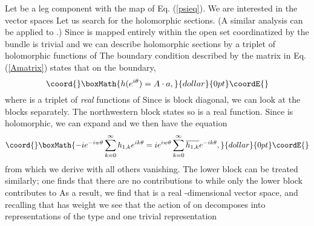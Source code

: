 \documentclass[a4paper,11pt]{article}
\begin{document}
Let \coordHE{} be a leg component with \myHighlight{$\psi$}\coordHE{} the map
of Eq. (\ref{psieq}).  We are interested in the vector
spaces \coordHE{}  \coordHE{}
Let us search for \coordHE{} the holomorphic sections.  (A
similar analysis can be applied to \coordHE{}.)
Since \coordHE{} is mapped entirely
within the open set \coordHE{} coordinatized by
\coordHE{} the bundle \coordHE{} is trivial and we can
describe holomorphic sections by a triplet
\coordHE{} of holomorphic functions of \coordHE{}
The boundary condition described by the 
matrix \coordHE{} in Eq. (\ref{Amatrix})
states that on the boundary,
$$\coord{}\boxMath{h(e^{i\theta}) = A\cdot a,}{dollar}{0pt}\coordE{}$$ 
where \coordHE{} is a triplet of {\em real} functions of \coordHE{}
Since \coordHE{} is block diagonal, we can look at the blocks
separately.  The northwestern \coordHE{} block states
\coordHE{}
so \coordHE{} is a real function.
Since \coordHE{} is holomorphic, we can expand
\coordHE{}
and we then have the equation
$$\coord{}\boxMath{-ie^{-iw\theta}\sum_{k=0}^{\infty}h_{1,k}e^{ik\theta}=
ie^{iw\theta}\sum_{k=0}^{\infty}
\overline{h_{1,k}}e^{-ik\theta},}{dollar}{0pt}\coordE{}$$
from which we derive \coordHE{}  \coordHE{} with all others vanishing.
The lower block can be treated similarly; one
finds that there are no contributions to
\coordHE{} while only the lower block contributes
to \coordHE{}
As a result, we find that \coordHE{} is a
real \coordHE{}-dimensional vector space, and recalling
that \coordHE{} has weight \coordHE{} we see that the
action of \coordHE{} on \coordHE{} decomposes into representations
of the type \coordHE{}  \coordHE{} and one trivial representation
\end{document}
